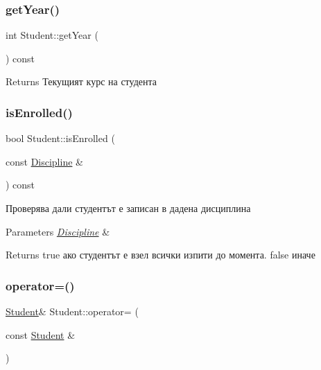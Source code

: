 \subsubsection{\texorpdfstring{get\+Year()}{getYear()}}
{\footnotesize\ttfamily int Student\+::get\+Year (\begin{DoxyParamCaption}{ }\end{DoxyParamCaption}) const}

\begin{DoxyReturn}{Returns}
Текущият курс на студента 
\end{DoxyReturn}
\mbox{\label{class_student_a21cc1d849823294752049a9eef021135}} 
\subsubsection{\texorpdfstring{is\+Enrolled()}{isEnrolled()}}
{\footnotesize\ttfamily bool Student\+::is\+Enrolled (\begin{DoxyParamCaption}\item[{const \hyperlink{class_discipline}{Discipline} \&}]{ }\end{DoxyParamCaption}) const}



Проверява дали студентът е записан в дадена дисциплина 


\begin{DoxyParams}{Parameters}
{\em \hyperlink{class_discipline}{Discipline}} & \\
\hline
\end{DoxyParams}
\begin{DoxyReturn}{Returns}
true ако студентът е взел всички изпити до момента. false иначе 
\end{DoxyReturn}
\mbox{\label{class_student_aea411d7956cc1712b7d0e15eb7ed0832}} 
\subsubsection{\texorpdfstring{operator=()}{operator=()}}
{\footnotesize\ttfamily \hyperlink{class_student}{Student}\& Student\+::operator= (\begin{DoxyParamCaption}\item[{const \hyperlink{class_student}{Student} \&}]{ }\end{DoxyParamCaption})}



